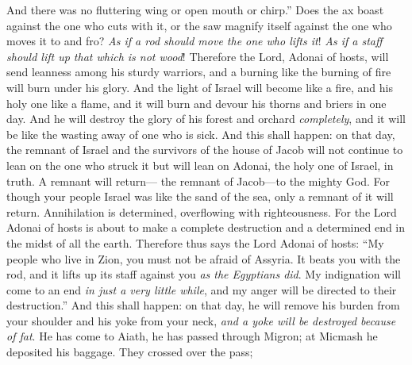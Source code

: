 \begin{biblechapter}
And there was no fluttering wing or open mouth or chirp.”
\verse Does the ax boast against the one who cuts with it, 
or the saw magnify itself against the one who moves it to and fro? 
\textit{As if a rod should move the one who lifts it}! 
\textit{As if a staff should lift up that which is not wood}!
\verse Therefore the Lord, Adonai of hosts, will send leanness among his sturdy warriors, 
and a burning like the burning of fire will burn under his glory.
\verse And the light of Israel will become like a fire, 
and his holy one like a flame, 
and it will burn and devour his thorns and briers in one day.
\verse And he will destroy the glory of his forest and orchard \textit{completely}, 
and it will be like the wasting away of one who is sick.
 And this shall happen: on that day, the remnant of Israel and the survivors of the house of Jacob will not continue to lean on the one who struck it 
but will lean on Adonai, the holy one of Israel, in truth.
\verse A remnant will return— 
the remnant of Jacob—to the mighty God.
\verse For though your people Israel was like the sand of the sea, 
only a remnant of it will return. 
Annihilation is determined, 
overflowing with righteousness.
\verse For the Lord Adonai of hosts is about to make a complete destruction 
and a determined end in the midst of all the earth.
\verse Therefore thus says the Lord Adonai of hosts:
\verse “My people who live in Zion, 
you must not be afraid of Assyria. 
It beats you with the rod, 
and it lifts up its staff against you \textit{as the Egyptians did}.
\verse My indignation will come to an end \textit{in just a very little while}, 
and my anger will be directed to their destruction.”
\verse And this shall happen: on that day,
\verse he will remove his burden from your shoulder 
and his yoke from your neck, 
\textit{and a yoke will be destroyed because of fat}.
\verse He has come to Aiath, 
he has passed through Migron; 
at Micmash he deposited his baggage.
\verse They crossed over the pass; 

\end{biblechapter}
